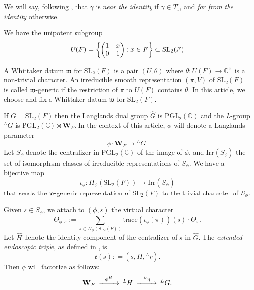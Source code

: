 \documentclass[11pt]{amsart}
\numberwithin{equation}{section}
\def\Irr{\mathrm{Irr}}
\def\fe{\mathfrak{e}}
\def\fw{\mathfrak{w}}
\def\PGL{\mathrm{PGL}}
\def\C{\mathbb{C}}
\def\SL{\mathrm{SL}}
\def\W{\mathbf{W}}
\def\trace{\mathrm{trace}}
\newcommand{\<}{\left\langle}
\renewcommand{\>}{\right\rangle}
\begin{document}
We will say, following \cite{ADSS}, that  $\gamma$ is \emph{near the identity} if $\gamma \in T_1^\varepsilon$,
and \emph{far from the identity} otherwise.  

We have the unipotent subgroup
\[
U(F) =\left\{ \left(
\begin{matrix}
1 & x \cr
0 & 1
\end{matrix}\right) : x \in F \right \} \subset \SL_2(F)
\]


 A Whittaker datum $\fw$  for $\SL_2(F)$  is a pair $(U, \theta)$ where   $\theta : U(F) \to \C^\times$ is a non-trivial character.     
 An irreducible smooth representation $(\pi, V)$ of $\SL_2(F)$  is called $\fw$-generic if the restriction of $\pi$ to $U(F)$ contains $\theta$.   
In this article,  we choose and fix a Whittaker datum $\fw$ for $\SL_2(F)$.   

If $G = \SL_2(F)$ then the Langlands dual group $\widehat{G}$ is $\PGL_2(\C)$ and the $L$-group ${}^LG$ is $\PGL_2(\C) \rtimes \W_F$.
In the context of this article, $\phi$ will denote a Langlands parameter
\[
\phi : \W_F \to {}^LG.
\]  
Let $S_\phi$  denote the centralizer in $\PGL_2(\C)$ of the image of $\phi$, and $\Irr(S_\phi)$ the set of isomorphism classes of irreducible representations of $S_\phi$. We have a bijective map
\begin{equation}
\iota_\phi  \colon \Pi_\phi(\SL_2(F))  \to \Irr(S_\phi)
\end{equation}
that sends the $\fw$-generic representation of $\SL_2(F)$ to the trivial character of $S_\phi$.   

Given  $s \in S_\phi$, we attach to $(\phi,s)$ the  virtual character    
\begin{equation} \label{eqn:virtual}                                                       
\Theta_{\phi, s} := \sum_{\pi\in\Pi_\phi(\SL_2(F)) } \trace(\iota_\phi(\pi))(s) \cdot \Theta_{\pi}.
\end{equation}
Let $\widehat{H}$ denote the identity component of the centralizer of $s$ in $\widehat{G}$. The \emph{extended endoscopic triple}, as defined in \cite[\S6.2]{T},  is 
        \[
        \fe(s): = (s, H, {}^L\eta).
        \]     Then $\phi$ will factorize as follows:
       \[
       \begin{CD}
       \W_F @> \phi^H >> {}^LH @> {}^L\eta >> {}^LG.
       \end{CD}
       \]
           
\end{document}
